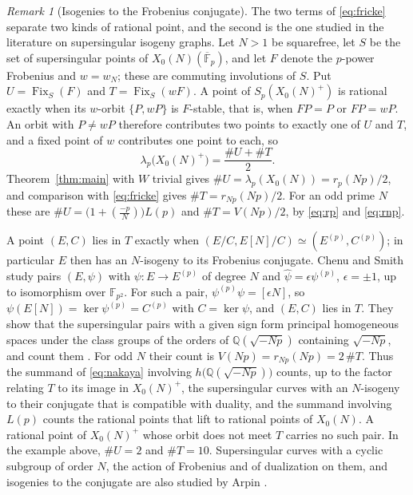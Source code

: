 \documentclass[11pt,a4paper]{article}
\theoremstyle{remark}\newtheorem{remark}[theorem]{Remark}
\numberwithin{equation}{section}
\newcommand{\Q}{\mathbb Q}\newcommand{\Z}{\mathbb Z}
\newcommand{\kk}{\overline{\mathbb F}_p}
\newcommand{\Fix}{\operatorname{Fix}}
\newcommand{\leg}[2]{\left(\frac{#1}{#2}\right)}
\newcommand{\hK}[1]{h\bigl(\Q(\sqrt{-#1})\bigr)}
\begin{document}
\begin{remark}[Isogenies to the Frobenius conjugate]\label{rem:isogeny}
	The two terms of \eqref{eq:fricke} separate two kinds of rational point, and the second is the one studied in the literature on supersingular isogeny graphs. Let $N>1$ be squarefree, let $S$ be the set of supersingular points of $X_0(N)(\kk)$, and let $F$ denote the $p$-power Frobenius and $w=w_N$; these are commuting involutions of $S$. Put $U=\Fix_S(F)$ and $T=\Fix_S(wF)$. A point of $S_p(X_0(N)^+)$ is rational exactly when its $w$-orbit $\{P,wP\}$ is $F$-stable, that is, when $FP=P$ or $FP=wP$. An orbit with $P\neq wP$ therefore contributes two points to exactly one of $U$ and $T$, and a fixed point of $w$ contributes one point to each, so
	\[
	\lambda_p\bigl(X_0(N)^+\bigr)=\frac{\#U+\#T}{2}.
	\]
	Theorem~\ref{thm:main} with $W$ trivial gives $\#U=\lambda_p(X_0(N))=r_p(Np)/2$, and comparison with \eqref{eq:fricke} gives $\#T=r_{Np}(Np)/2$. For an odd prime $N$ these are $\#U=\bigl(1+\leg{-p}{N}\bigr)L(p)$ and $\#T=V(Np)/2$, by \eqref{eq:rp} and \eqref{eq:rnp}.
	
	A point $(E,C)$ lies in $T$ exactly when $(E/C,E[N]/C)\simeq(E^{(p)},C^{(p)})$; in particular $E$ then has an $N$-isogeny to its Frobenius conjugate. Chenu and Smith \cite{ChenuSmith} study pairs $(E,\psi)$ with $\psi\colon E\to E^{(p)}$ of degree $N$ and $\widehat\psi=\epsilon\psi^{(p)}$, $\epsilon=\pm1$, up to isomorphism over $\mathbb F_{p^2}$. For such a pair, $\psi^{(p)}\psi=[\epsilon N]$, so $\psi(E[N])=\ker\psi^{(p)}=C^{(p)}$ with $C=\ker\psi$, and $(E,C)$ lies in $T$. They show that the supersingular pairs with a given sign form principal homogeneous spaces under the class groups of the orders of $\Q(\sqrt{-Np})$ containing $\sqrt{-Np}$, and count them \cite[Theorem~2 and Corollary~1]{ChenuSmith}. For odd $N$ their count is $V(Np)=r_{Np}(Np)=2\,\#T$. Thus the summand of \eqref{eq:nakaya} involving $\hK{Np}$ counts, up to the factor relating $T$ to its image in $X_0(N)^+$, the supersingular curves with an $N$-isogeny to their conjugate that is compatible with duality, and the summand involving $L(p)$ counts the rational points that lift to rational points of $X_0(N)$. A rational point of $X_0(N)^+$ whose orbit does not meet $T$ carries no such pair. In the example above, $\#U=2$ and $\#T=10$. Supersingular curves with a cyclic subgroup of order $N$, the action of Frobenius and of dualization on them, and isogenies to the conjugate are also studied by Arpin \cite{Arpin}.
\end{remark}
\end{document}
